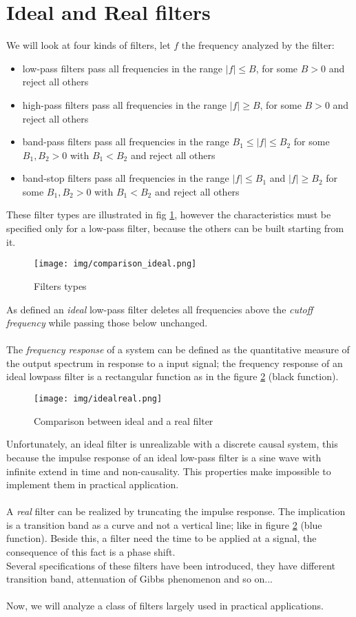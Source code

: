 \section{Ideal and Real filters}
We will look at four kinds of filters, let $f$ the frequency analyzed by the filter:
\begin{itemize}
\item low-pass filters pass all frequencies in the range $|f| \leq B$, for some $B > 0$ and reject all others
\item high-pass filters pass all frequencies in the range $|f| \geq B$, for some $B > 0$ and reject all others
\item band-pass filters pass all frequencies in the range $B_1 \leq |f| \leq B_2$ for some $B_1, B_2 > 0$ with $B_1 < B_2$ and reject all others
\item band-stop filters pass all frequencies in the range $|f| \leq B_1$ and $|f| \geq B_2$ for some $B_1, B_2 > 0$ with $B_1 < B_2$ and reject all others
\end{itemize}
These filter types are illustrated in fig \ref{fig:ideal_types}, however the characteristics must be specified only for a low-pass filter, because the others can be built starting from it.
\begin{figure}[h]\centering
\texttt{[image: img/comparison\_ideal.png]} 
\caption{Filters types} \label{fig:ideal_types}
\end{figure}
As defined an \textit{ideal} low-pass filter deletes all frequencies above the \textit{cutoff frequency} while passing those below unchanged.\\\\
The \textit{frequency response} of a system can be defined as the quantitative measure of the output spectrum in response to a input signal; the frequency response of an ideal lowpass filter is a rectangular function as in the figure \ref{fig:idealreallow} (black function).\\
\begin{figure}[H]\centering
\caption{Comparison between ideal and a real filter}\label{fig:idealreallow}
\texttt{[image: img/idealreal.png]} 
\end{figure}
Unfortunately, an ideal filter is unrealizable with a discrete causal system, this because the impulse response of an ideal low-pass filter is a sine wave with infinite extend in time and non-causality. This properties make impossible to implement them in practical application.\\\\
A \textit{real} filter can be realized by truncating the impulse response. The implication is a transition band as a curve and not a vertical line; like in figure \ref{fig:idealreallow} (blue function).
Beside this, a filter need the time to be applied at a signal, the consequence of this fact is a phase shift.\\
Several specifications of these filters have been introduced, they have different transition band, attenuation of Gibbs phenomenon and so on...\\\\
Now, we will analyze a class of filters largely used in practical applications.
